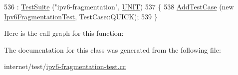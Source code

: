 \begin{DoxyCode}
536                                 : \hyperlink{classns3_1_1TestSuite_a904b0c40583b744d30908aeb94636d1a}{TestSuite} (\textcolor{stringliteral}{"ipv6-fragmentation"}, \hyperlink{classns3_1_1TestSuite_a1ebfcab34ec8161e085e8e3a1855eae0a3885375a3787abf60431f8454b3cadbd}{UNIT})
537   \{
538     \hyperlink{classns3_1_1TestCase_a3718088e3eefd5d6454569d2e0ddd835}{AddTestCase} (\textcolor{keyword}{new} \hyperlink{classIpv6FragmentationTest}{Ipv6FragmentationTest}, TestCase::QUICK);
539   \}
\end{DoxyCode}


Here is the call graph for this function\+:




The documentation for this class was generated from the following file\+:\begin{DoxyCompactItemize}
\item 
internet/test/\hyperlink{ipv6-fragmentation-test_8cc}{ipv6-\/fragmentation-\/test.\+cc}\end{DoxyCompactItemize}
